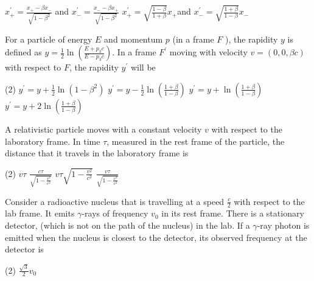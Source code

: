 \begin{enumerate}
\begin{tasks}
	\task[\textbf{C.}]$x_{+}^{\prime}=\frac{x_{+}-\beta x_{-}}{\sqrt{1-\beta^{2}}}$ and $x_{-}^{\prime}=\frac{x_{-}-\beta x_{+}}{\sqrt{1-\beta^{2}}}$
	\task[\textbf{D.}]$x_{+}^{\prime}=\sqrt{\frac{1-\beta}{1+\beta}} x_{+}$and $x_{-}^{\prime}=\sqrt{\frac{1+\beta}{1-\beta}} x_{-}$
\end{tasks}
\begin{minipage}{\textwidth}
	\item For a particle of energy $E$ and momentum $p$ (in a frame $F$ ), the rapidity $y$ is defined as $y=\frac{1}{2} \ln \left(\frac{E+p_{3} c}{E-p_{3} c}\right) .$ In a frame $F^{\prime}$ moving with velocity $v=(0,0, \beta c)$ with respect to $F$, the rapidity $y^{\prime}$ will be
\end{minipage}
\begin{tasks}(2)
	\task[\textbf{A.}] $y^{\prime}=y+\frac{1}{2} \ln \left(1-\beta^{2}\right)$
	\task[\textbf{B.}]$y^{\prime}=y-\frac{1}{2} \ln \left(\frac{1+\beta}{1-\beta}\right)$
	\task[\textbf{C.}]$y^{\prime}=y+\ln \left(\frac{1+\beta}{1-\beta}\right)$
	\task[\textbf{D.}]$y^{\prime}=y+2 \ln \left(\frac{1+\beta}{1-\beta}\right)$
\end{tasks}
\begin{minipage}{\textwidth}
	\item A relativistic particle moves with a constant velocity $v$ with respect to the laboratory frame. In time $\tau$, measured in the rest frame of the particle, the distance that it travels in the laboratory frame is
\end{minipage}
\begin{tasks}(2)
	\task[\textbf{A.}] $v \tau$
	\task[\textbf{B.}]$\frac{c \tau}{\sqrt{1-\frac{v^{2}}{c^{2}}}}$
	\task[\textbf{C.}]$v \tau \sqrt{1-\frac{v^{2}}{c^{2}}}$
	\task[\textbf{D.}]$\frac{v \tau}{\sqrt{1-\frac{v^{2}}{c^{2}}}}$
\end{tasks}
\begin{minipage}{\textwidth}
	\item Consider a radioactive nucleus that is travelling at a speed $\frac{c}{2}$ with respect to the lab frame. It emits $\gamma$-rays of frequency $v_{0}$ in its rest frame. There is a stationary detector, (which is not on the path of the nucleus) in the lab. If a $\gamma$-ray photon is emitted when the nucleus is closest to the detector, its observed frequency at the detector is
\end{minipage}
\begin{tasks}(2)
	\task[\textbf{A.}] $\frac{\sqrt{3}}{2} v_{0}$

\end{tasks}
\end{enumerate}
